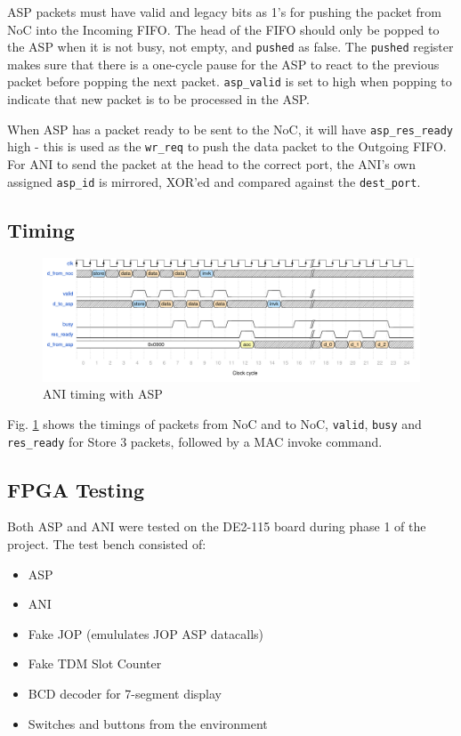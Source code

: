\documentclass[]{article}
\begin{document}
	ASP packets must have valid and legacy bits as 1's for pushing the packet from NoC into the Incoming FIFO. The head of the FIFO should only be popped to the ASP when it is not busy, not empty, and \texttt{pushed} as false. The \texttt{pushed} register makes sure that there is a one-cycle pause for the ASP to react to the previous packet before popping the next packet. \texttt{asp\_valid} is set to high when popping to indicate that new packet is to be processed in the ASP. \par
	
	When ASP has a packet ready to be sent to the NoC, it will have \texttt{asp\_res\_ready} high - this is used as the \texttt{wr\_req} to push the data packet to the Outgoing FIFO. For ANI to send the packet at the head to the correct port, the ANI's own assigned \texttt{asp\_id} is mirrored, XOR'ed and compared against the \texttt{dest\_port}.
	
	\subsection{Timing}
	
	\begin{figure}[H]
		\centering
		\includegraphics[width = 6.5in]{ani_timing}
		\caption{ANI timing with ASP}
		\label{fig:ani_timing}
	\end{figure}
	
	Fig. \ref{fig:ani_timing} shows the timings of packets from NoC and to NoC, \texttt{valid}, \texttt{busy} and \texttt{res\_ready} for Store 3 packets, followed by a MAC invoke command.
	
	
	\subsection{FPGA Testing}
	
	Both ASP and ANI were tested on the DE2-115 board during phase 1 of the project. The test bench consisted of:
	
	\begin{itemize}
		\item ASP
		\item ANI
		\item Fake JOP (emululates JOP ASP datacalls)
		\item Fake TDM Slot Counter
		\item BCD decoder for 7-segment display
		\item Switches and buttons from the environment
	\end{itemize}
	
\end{document}

